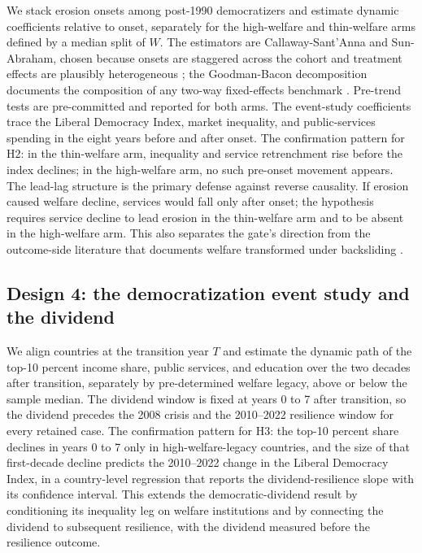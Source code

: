 \documentclass[11pt,letterpaper]{article}
\begin{document}
We stack erosion onsets among post-1990 democratizers and estimate dynamic coefficients relative to onset, separately for the high-welfare and thin-welfare arms defined by a median split of $W$. The estimators are Callaway-Sant'Anna and Sun-Abraham, chosen because onsets are staggered across the cohort and treatment effects are plausibly heterogeneous \citep{Callaway2021, SunAbraham2021}; the Goodman-Bacon decomposition documents the composition of any two-way fixed-effects benchmark \citep{GoodmanBacon2021}. Pre-trend tests are pre-committed and reported for both arms. The event-study coefficients trace the Liberal Democracy Index, market inequality, and public-services spending in the eight years before and after onset. The confirmation pattern for H2: in the thin-welfare arm, inequality and service retrenchment rise before the index declines; in the high-welfare arm, no such pre-onset movement appears. The lead-lag structure is the primary defense against reverse causality. If erosion caused welfare decline, services would fall only after onset; the hypothesis requires service decline to lead erosion in the thin-welfare arm and to be absent in the high-welfare arm. This also separates the gate's direction from the outcome-side literature that documents welfare transformed under backsliding \citep{SzikraOktem2023, LendvaiBainton2021, Vanhuysse2006, Benczes2024}.

\subsection{Design 4: the democratization event study and the dividend}

We align countries at the transition year $T$ and estimate the dynamic path of the top-10 percent income share, public services, and education over the two decades after transition, separately by pre-determined welfare legacy, above or below the sample median. The dividend window is fixed at years 0 to 7 after transition, so the dividend precedes the 2008 crisis and the 2010--2022 resilience window for every retained case. The confirmation pattern for H3: the top-10 percent share declines in years 0 to 7 only in high-welfare-legacy countries, and the size of that first-decade decline predicts the 2010--2022 change in the Liberal Democracy Index, in a country-level regression that reports the dividend-resilience slope with its confidence interval. This extends the democratic-dividend result \citep{AcemogluNaidu2015} by conditioning its inequality leg on welfare institutions and by connecting the dividend to subsequent resilience, with the dividend measured before the resilience outcome.
\end{document}
